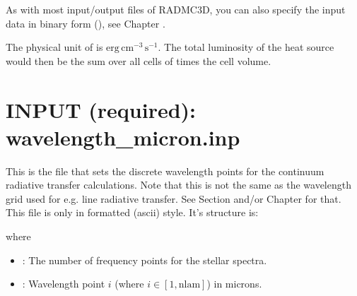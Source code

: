 \documentclass[letterpaper,10pt,english]{sphinxmanual}
\begin{document}
\begin{sphinxVerbatim}[commandchars=\\\{\}]
                                      
\PYG{p}{[}\PYG{p}{]}
\PYG{p}{[}\PYG{p}{]}
\end{sphinxVerbatim}

As with most input/output files of RADMC\sphinxhyphen{}3D, you can also specify the input
data in binary form (), see Chapter
{\hyperref[\detokenize{binaryio:chap-binary-io}]{}}.

The physical unit of  is
\(\mathrm{erg}\,\mathrm{cm}^{-3}\,\mathrm{s}^{-1}\). The total luminosity of
the heat source would then be the sum over all cells of  times the cell volume.


\section{INPUT (required): wavelength\_micron.inp}
\label{\detokenize{inputoutputfiles:input-required-wavelength-micron-inp}}\label{\detokenize{inputoutputfiles:sec-wavelengths}}
This is the file that sets the discrete wavelength points for the continuum
radiative transfer calculations. Note that this is not the same as the
wavelength grid used for e.g. line radiative transfer.  See Section
{\hyperref[\detokenize{inputoutputfiles:sec-camera-wavelengths}]{}} and/or Chapter {\hyperref[\detokenize{lineradtrans:chap-line-transfer}]{}} for
that. This file is only in formatted (ascii) style. It’s structure is:

\begin{sphinxVerbatim}[commandchars=\\\{\}]
\PYG{p}{[}\PYG{p}{]}
\PYG{p}{[}\PYG{p}{]}
\end{sphinxVerbatim}

where
\begin{itemize}
\item {} 
: The number of frequency points for the stellar
spectra.

\item {} 
: Wavelength point \(i\) (where \(i\in [1,\mathrm{nlam}]\)) in microns.

\end{itemize}
\end{document}
